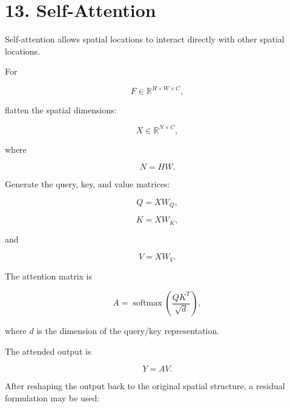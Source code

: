 \documentclass[10pt]{article}
\begin{document}
\begin{center}


\end{center}

\section*{13. Self-Attention}

Self-attention allows spatial locations to interact directly with other
spatial locations.

For

\[
F\in\mathbb{R}^{H\times W\times C},
\]

flatten the spatial dimensions:

\[
X\in\mathbb{R}^{N\times C},
\]

where

\[
N=HW.
\]

Generate the query, key, and value matrices:

\[
Q=XW_Q,
\]

\[
K=XW_K,
\]

and

\[
V=XW_V.
\]

The attention matrix is

\[
A
=
\operatorname{softmax}
\left(
\frac{QK^T}{\sqrt{d}}
\right),
\]

where $d$ is the dimension of the query/key representation.

The attended output is

\[
Y=AV.
\]

After reshaping the output back to the original spatial structure, a residual
formulation may be used:
\end{document}

